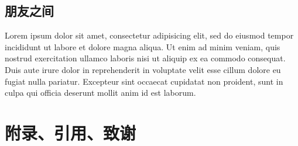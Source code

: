 \documentclass[utf8]{book}
\begin{document}
\chapter{朋友之间}
\begin{multicols}{2}
Lorem ipsum dolor sit amet, consectetur adipisicing elit, sed do eiusmod tempor incididunt ut labore et dolore magna aliqua. Ut enim ad minim veniam, quis nostrud exercitation ullamco laboris nisi ut aliquip ex ea commodo consequat. Duis aute irure dolor in reprehenderit in voluptate velit esse cillum dolore eu fugiat nulla pariatur. Excepteur sint occaecat cupidatat non proident, sunt in culpa qui officia deserunt mollit anim id est laborum.
\end{multicols}

%

\part{附录、引用、致谢}
\appendix
\end{document}
